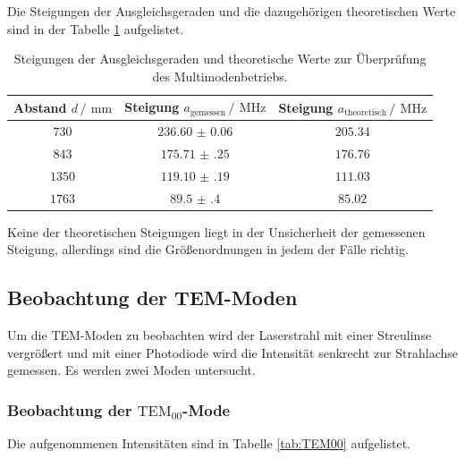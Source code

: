Die Steigungen der Ausgleichsgeraden und die dazugehörigen theoretischen Werte sind in der Tabelle \ref{tab:Steigungen} aufgelistet.

\FloatBarrier
\begin{table}
  \centering
  \caption{Steigungen der Ausgleichsgeraden und theoretische Werte zur Überprüfung des Multimodenbetriebs.}
  \label{tab:Steigungen}
  \begin{tabular}{c c c}
    \toprule
    Abstand $d\,/\,\SI{}{\milli\meter}$&Steigung $a_{\text{gemessen}}\,/\,\SI{}{\mega\hertz}$&Steigung $a_{\text{theoretisch}}\,/\,\SI{}{\mega\hertz}$\\
    \midrule
    $\num{730}$&$\num{236.60(6)}$&$\num{205.34}$\\
    $\num{843}$&$\num{175.71(25)}$&$\num{176.76}$\\
    $\num{1350}$&$\num{119.10(19)}$&$\num{111.03}$\\
    $\num{1763}$&$\num{89.5(4)}$&$\num{85.02}$\\
    \bottomrule
  \end{tabular}
\end{table}
\FloatBarrier

Keine der theoretischen Steigungen liegt in der Unsicherheit der gemessenen Steigung, allerdings sind die Größenordnungen 
in jedem der Fälle richtig.

\subsection{Beobachtung der TEM-Moden}

Um die TEM-Moden zu beobachten wird der Laserstrahl mit einer Streulinse vergrößert und mit einer Photodiode wird die 
Intensität senkrecht zur Strahlachse gemessen.
Es werden zwei Moden untersucht. 

\subsubsection{Beobachtung der \texorpdfstring{$\text{TEM}_{00}$}{T1}-Mode}

Die aufgenommenen Intensitäten sind in Tabelle \ref{tab:TEM00} aufgelistet.

